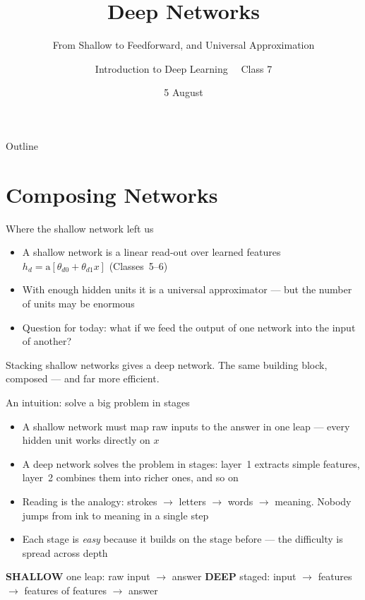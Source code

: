 \documentclass[aspectratio=169, 11pt]{beamer}
\title{Deep Networks}
\subtitle{From Shallow to Feedforward, and Universal Approximation}
\author{Introduction to Deep Learning \ \textperiodcentered\ Class 7}
\institute{}
\date{5 August}
\newcommand{\shpar}[2]{%
  \vfill
  {\footnotesize
  \begin{tcolorbox}[enhanced, sidebyside, sidebyside align=top,
                    lefthand ratio=0.485,
                    segmentation style={shc!35, line width=0.6pt},
                    colback=shc!5, colframe=shc!35, boxrule=0.5pt,
                    arc=1.5mm, left=2mm, right=2mm, top=0.8mm, bottom=0.8mm]
    {\color{shc}\textbf{SHALLOW}}\;\; #1
  \tcblower
    {\color{dpc}\textbf{DEEP}}\;\; #2
  \end{tcolorbox}}%
  \vspace{0.6em}%
}
\newcommand{\nosrc}{}       %
\begin{document}
\maketitle

\begin{frame}{Outline}
  \nosrc
  \tableofcontents
\end{frame}

\section{Composing Networks}

\begin{frame}{Where the shallow network left us}
  \nosrc
  \begin{itemize}
    \item A shallow network is a linear read-out over
          \alert{learned features} $h_d=\mathrm{a}[\theta_{d0}
          +\theta_{d1}x]$ (Classes~5--6)
    \item With enough hidden units it is a
          \alert{universal approximator} --- but the number of
          units may be enormous
    \item Question for today: what if we feed the output of
          one network into the \alert{input of another}?
  \end{itemize}
  \vspace{0.3em}
  \begin{redhighlight}
    Stacking shallow networks gives a \alert{deep network}.
    The same building block, composed --- and far more
    efficient.
  \end{redhighlight}
\end{frame}

\begin{frame}{An intuition: solve a big problem in stages}
  \nosrc
  \begin{itemize}
    \item A shallow network must map raw inputs to the answer
          in \alert{one leap} --- every hidden unit works
          directly on $x$
    \item A deep network solves the problem in
          \alert{stages}: layer~1 extracts simple features,
          layer~2 combines them into richer ones, and so on
    \item Reading is the analogy: \alert{strokes $\to$
          letters $\to$ words $\to$ meaning}. Nobody jumps
          from ink to meaning in a single step
    \item Each stage is \emph{easy} because it builds on the
          stage before --- the difficulty is \alert{spread
          across depth}
  \end{itemize}
  \shpar{one leap: raw input $\to$ answer}
        {staged: input $\to$ features $\to$ features of
         features $\to$ answer}
\end{frame}
\end{document}
